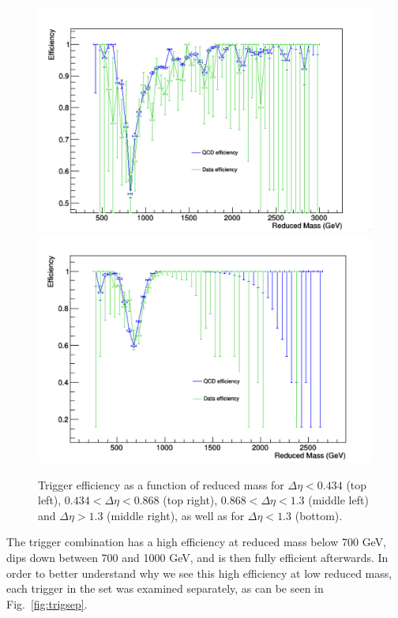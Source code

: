 \begin{figure}[thb!]
\begin{center}
\includegraphics[scale=0.25]{Figures/deta3.pdf}\\
\includegraphics[scale=0.25]{Figures/deta012.pdf}
\end{center}
\caption{Trigger efficiency as a function of reduced mass for $\Delta\eta < 0.434$ (top left), $0.434 < \Delta\eta < 0.868$ (top right), $0.868 < \Delta\eta < 1.3$ (middle left) and $\Delta\eta > 1.3$ (middle right), as well as for $\Delta\eta < 1.3$ (bottom).}
\label{fig:trigdEta}
\end{figure}

The trigger combination has a high efficiency at reduced mass below 700 GeV, dips down between 700 and 1000 GeV, and is then fully efficient afterwards. In order to better understand why we see this high efficiency at low reduced mass, each trigger in the set was examined separately, as can be seen in Fig.~\ref{fig:trigsep}.

